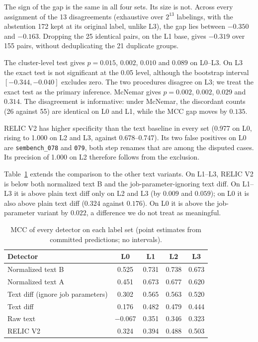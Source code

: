 \documentclass[conference]{IEEEtran}
\begin{document}
The sign of the gap is the same in all four sets. Its size is not. Across every assignment of the 13 disagreements (exhaustive over $2^{13}$ labelings, with the abstention 172 kept at its original label, unlike L3), the gap lies between $-0.350$ and $-0.163$. Dropping the 25 identical pairs, on the L1 base, gives $-0.319$ over 155 pairs, without deduplicating the 21 duplicate groups.

The cluster-level test gives $p=0.015$, $0.002$, $0.010$ and $0.089$ on L0–L3. On L3 the exact test is not significant at the 0.05 level, although the bootstrap interval $[-0.344,-0.040]$ excludes zero. The two procedures disagree on L3; we treat the exact test as the primary inference. McNemar gives $p=0.002$, $0.002$, $0.029$ and $0.314$. The disagreement is informative: under McNemar, the discordant counts (26 against 55) are identical on L0 and L1, while the MCC gap moves by $0.135$.

RELIC V2 has higher specificity than the text baseline in every set (0.977 on L0, rising to 1.000 on L2 and L3, against 0.678--0.747). Its two false positives on L0 are \texttt{sembench\_078} and \texttt{079}, both step renames that are among the disputed cases. Its precision of 1.000 on L2 therefore follows from the exclusion.

Table~\ref{tab:all} extends the comparison to the other text variants. On L1--L3, RELIC V2 is below both normalized text B and the job-parameter-ignoring text diff. On L1--L3 it is above plain text diff only on L2 and L3 (by $0.009$ and $0.059$); on L0 it is also above plain text diff ($0.324$ against $0.176$). On L0 it is above the job-parameter variant by $0.022$, a difference we do not treat as meaningful.

\begin{table}[t]
\caption{MCC of every detector on each label set (point estimates from committed predictions; no intervals).}
\label{tab:all}
\centering
\small
\begin{tabular}{@{}lcccc@{}}
\toprule
Detector & L0 & L1 & L2 & L3 \\
\midrule
Normalized text B & 0.525 & 0.731 & 0.738 & 0.673 \\
Normalized text A & 0.451 & 0.673 & 0.677 & 0.620 \\
Text diff (ignore job parameters) & 0.302 & 0.565 & 0.563 & 0.520 \\
Text diff & 0.176 & 0.482 & 0.479 & 0.444 \\
Raw text & $-0.067$ & 0.351 & 0.346 & 0.323 \\
RELIC V2 & 0.324 & 0.394 & 0.488 & 0.503 \\
\bottomrule
\end{tabular}
\end{table}
\end{document}
